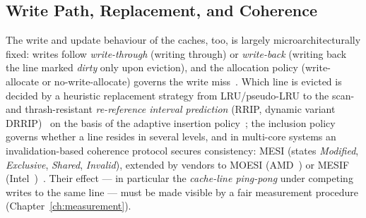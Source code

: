 \begin{nurkurz}
\subsection{Write Path, Replacement, and Coherence}\label{subsec:write-coherence}
The write and update behaviour of the caches, too, is largely microarchitecturally fixed: writes follow
\emph{write-through} (writing through) or \emph{write-back} (writing back the line marked \emph{dirty} only
upon eviction), and the allocation policy (write-allocate or no-write-allocate) governs the write
miss~\cite{arm_arm,intel_sdm}. Which line is evicted is decided by a heuristic replacement strategy from
LRU/pseudo-LRU to the scan- and thrash-resistant \emph{re-reference interval prediction} (RRIP, dynamic
variant DRRIP)~\cite{jaleel2010rrip} on the basis of the adaptive insertion policy~\cite{qureshi2007adaptive};
the inclusion policy governs whether a line resides in several levels, and in multi-core systems an
invalidation-based coherence protocol secures consistency: MESI (states \emph{Modified}, \emph{Exclusive},
\emph{Shared}, \emph{Invalid}), extended by vendors to MOESI (AMD~\cite{amd_sog}) or MESIF
(Intel~\cite{intel_optimization})~\cite{hennessy2019architecture}. Their effect --- in particular the
\emph{cache-line ping-pong} under competing writes to the same line --- must be made visible by a fair
measurement procedure (Chapter~\ref{ch:measurement}).
\end{nurkurz}

